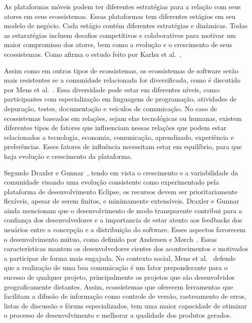 \documentclass[conference]{IEEEtran}
\begin{document}
As plataformas móveis podem ter diferentes estratégias para a relação com seus atores em seus ecossistemas. Essas plataformas tem diferentes estágios em seu modelo de negócio. Cada estágio contém diferentes estratégias e dinâmicas. Todas as estaratégias incluem desafios competitivos e colaborativos para motivar um maior compromisso dos atores, bem como a evolução e o crescimento de seus ecossistemas. Como afirma o estudo feito por Karhu et al.~\cite{Karhu2009}. 

Assim como em outros tipos de ecossistemas, os ecossistemas de software serão mais resistentes se a comunidade relacionada for diversificada, como é discutido por Mens et al.~\cite{Mens2014}. Essa diversidade pode estar em diferentes níveis, como: participantes com especialização em linguagens de programação, atividades de depuração, testes, documentação e veículos de comunicação. No caso de ecossistemas baseados em relações, sejam elas tecnológicas ou humanas, existem diferentes tipos de fatores que influenciam nessas relações que podem estar relacionados a tecnologia, economia, comunicação, aprendizado, experiência e preferências. Esses fatores de influência necessitam estar em equilíbrio, para que haja evolução e crescimento da plataforma. 

Segundo Draxler e Gunnar~\cite{Draxler2011}, tendo em vista o crescimento e a variabilidade da comunidade visando uma evolução consistente como experimentado pela plataforma de desenvolvimento Eclipse, os recursos devem ser prioritariamente flexíveis, apesar de serem finitos, e minimamente extensíveis. Draxler e Gunnar~\cite{Draxler2011} ainda mencionam que o desenvolvimento de modo transparente contribui para a confiança dos desenvolvedores e a importancia de estar atento aos feedbacks dos usuários entre a concepção e a distribuição do software. Esses aspectos favorecem o desenvolvimento mútuo, como definido por Andersen e Mørch~\cite{Andersen2009}. Essas características  mantem os desenvolvedores cientes dos acontecimentos e motivados a participar de forma mais engajada. No contexto social, Mens et al.~\cite{Mens2014} defende que a realização de uma boa comunicação é um fator preponderante para o sucesso de qualquer projeto, principalmente os projetos que são desenvolvidos geograficamente distantes. Assim, ecossistemas que oferecem ferramentas que facilitam a difusão de informação como controle de versão, rastreamento de erros, listas de discussão e fóruns especializados,  tem uma maior capacidade de otimizar o processo de desenvolvimento e melhorar a qualidade dos produtos gerados.
\end{document}
